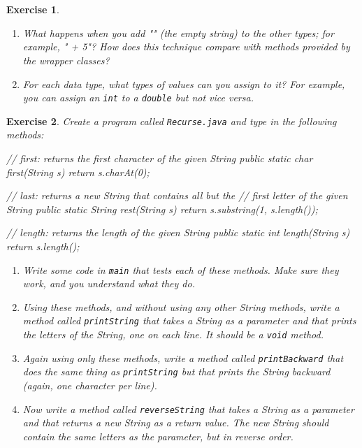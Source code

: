\documentclass[12pt]{book}
\theoremstyle{exercise}
\newtheorem{exercise}{Exercise}[chapter]
\newcommand{\java}[1]{\verb"#1"}
\newcommand{\java}[1]{\lstinline{#1}} %
\begin{document}
\begin{exercise}
\begin{enumerate}
\item What happens when you add \java{""} (the empty string) to the other types; for example, \java{"" + 5}?
How does this technique compare with methods provided by the wrapper classes?

\item For each data type, what types of values can you assign to it?
For example, you can assign an \java{int} to a \java{double} but not vice versa.

\end{enumerate}

\end{exercise}


\begin{exercise}

Create a program called {\tt Recurse.java} and type in the following methods:

\begin{code}
    // first: returns the first character of the given String
    public static char first(String s) {
        return s.charAt(0);
    }

    // last: returns a new String that contains all but the
    // first letter of the given String
    public static String rest(String s) {
        return s.substring(1, s.length());
    }

    // length: returns the length of the given String
    public static int length(String s) {
        return s.length();
    }
\end{code}

\begin{enumerate}

\item Write some code in \java{main} that tests each of these methods.
Make sure they work, and you understand what they do.

\item Using these methods, and without using any other String methods, write a method called \java{printString} that takes a String as a parameter and that prints the letters of the String, one on each line.
It should be a \java{void} method.

\item Again using only these methods, write a method called \java{printBackward} that does the same thing as \java{printString} but that prints the String backward (again, one character per line).

\item Now write a method called \java{reverseString} that takes a String as a parameter and that returns a new String as a return value.
The new String should contain the same letters as the parameter, but in reverse order.


\end{enumerate}
\end{exercise}
\end{document}
